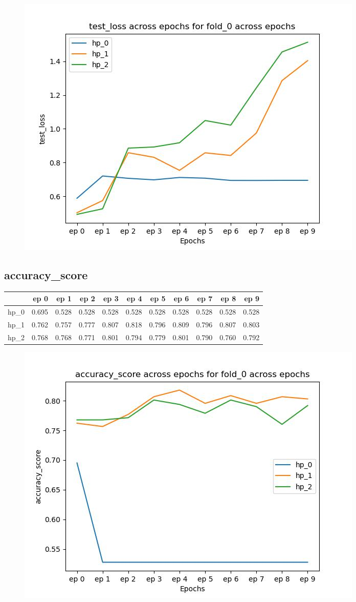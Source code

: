 \documentclass{article}
\begin{document}
\begin{figure}[H]
\includegraphics[scale = 0.75]{fold_0/test_loss}
\end{figure}
\subsection{accuracy\_score}
\begin{tabular}{lrrrrrrrrrr}
\toprule
{} &   ep 0 &   ep 1 &   ep 2 &   ep 3 &   ep 4 &   ep 5 &   ep 6 &   ep 7 &   ep 8 &   ep 9 \\
\midrule
hp\_0 &  0.695 &  0.528 &  0.528 &  0.528 &  0.528 &  0.528 &  0.528 &  0.528 &  0.528 &  0.528 \\
hp\_1 &  0.762 &  0.757 &  0.777 &  0.807 &  0.818 &  0.796 &  0.809 &  0.796 &  0.807 &  0.803 \\
hp\_2 &  0.768 &  0.768 &  0.771 &  0.801 &  0.794 &  0.779 &  0.801 &  0.790 &  0.760 &  0.792 \\
\bottomrule
\end{tabular}

\begin{figure}[H]
\includegraphics[scale = 0.75]{fold_0/accuracy_score}
\end{figure}
\end{document}
